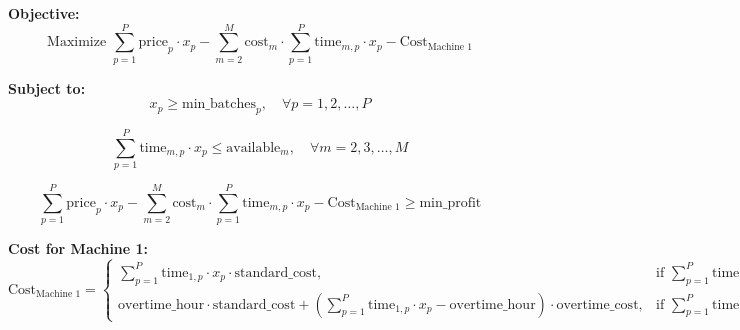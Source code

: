 \documentclass{article}
\begin{document}
\textbf{Objective:}
\[
\text{Maximize } \sum_{p=1}^{P} \text{price}_p \cdot x_p - \sum_{m=2}^{M} \text{cost}_m \cdot \sum_{p=1}^{P} \text{time}_{m,p} \cdot x_p - \text{Cost}_{\text{Machine 1}}
\]

\textbf{Subject to:}
\[ 
x_p \geq \text{min_batches}_p, \quad \forall p = 1, 2, \ldots, P 
\]

\[
\sum_{p=1}^{P} \text{time}_{m,p} \cdot x_p \leq \text{available}_m, \quad \forall m = 2, 3, \ldots, M
\]

\[
\sum_{p=1}^{P} \text{price}_p \cdot x_p - \sum_{m=2}^{M} \text{cost}_m \cdot \sum_{p=1}^{P} \text{time}_{m,p} \cdot x_p - \text{Cost}_{\text{Machine 1}} \geq \text{min_profit}
\]

\textbf{Cost for Machine 1:}
\[
\text{Cost}_{\text{Machine 1}} = 
\begin{cases} 
\sum_{p=1}^{P} \text{time}_{1,p} \cdot x_p \cdot \text{standard_cost}, & \text{if } \sum_{p=1}^{P} \text{time}_{1,p} \cdot x_p \leq \text{overtime_hour} \\
\text{overtime_hour} \cdot \text{standard_cost} + \left( \sum_{p=1}^{P} \text{time}_{1,p} \cdot x_p - \text{overtime_hour} \right) \cdot \text{overtime_cost}, & \text{if } \sum_{p=1}^{P} \text{time}_{1,p} \cdot x_p > \text{overtime_hour}
\end{cases}
\]
\end{document}

